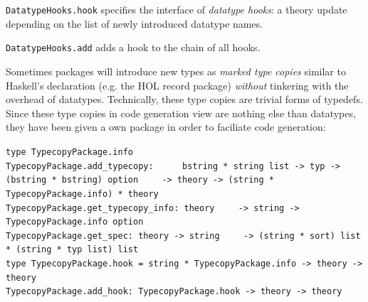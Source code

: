 \begin{isabellebody}
\begin{isamarkuptext}
  \begin{description}

  \item \verb|DatatypeHooks.hook| specifies the interface
     of \emph{datatype hooks}: a theory update
     depending on the list of newly introduced
     datatype names.

  \item \verb|DatatypeHooks.add| adds a hook to the
     chain of all hooks.

  \end{description}%
\end{isamarkuptext}%
\isamarkuptrue%
%
\endisatagmlref
{\isafoldmlref}%
%
\isadelimmlref
%
\endisadelimmlref
%
\isamarkuptrue%
%
\begin{isamarkuptext}%
Sometimes packages will introduce new types
  as \emph{marked type copies} similar to Haskell's
   declaration (e.g. the HOL record package)
  \emph{without} tinkering with the overhead of datatypes.
  Technically, these type copies are trivial forms of typedefs.
  Since these type copies in code generation view are nothing
  else than datatypes, they have been given a own package
  in order to faciliate code generation:%
\end{isamarkuptext}%
\isamarkuptrue%
%
\isadelimmlref
%
\endisadelimmlref
%
\isatagmlref
%
\begin{isamarkuptext}%
\begin{mldecls}
  \verb|type TypecopyPackage.info| \\
  \verb|TypecopyPackage.add_typecopy: |\isasep\isanewline%
\verb|    bstring * string list -> typ -> (bstring * bstring) option|\isasep\isanewline%
\verb|    -> theory -> (string * TypecopyPackage.info) * theory| \\
  \verb|TypecopyPackage.get_typecopy_info: theory|\isasep\isanewline%
\verb|    -> string -> TypecopyPackage.info option| \\
  \verb|TypecopyPackage.get_spec: theory -> string|\isasep\isanewline%
\verb|    -> (string * sort) list * (string * typ list) list| \\
  \verb|type TypecopyPackage.hook = string * TypecopyPackage.info -> theory -> theory| \\
  \verb|TypecopyPackage.add_hook: TypecopyPackage.hook -> theory -> theory| \\
  \end{mldecls}


\end{isamarkuptext}
\end{isabellebody}
